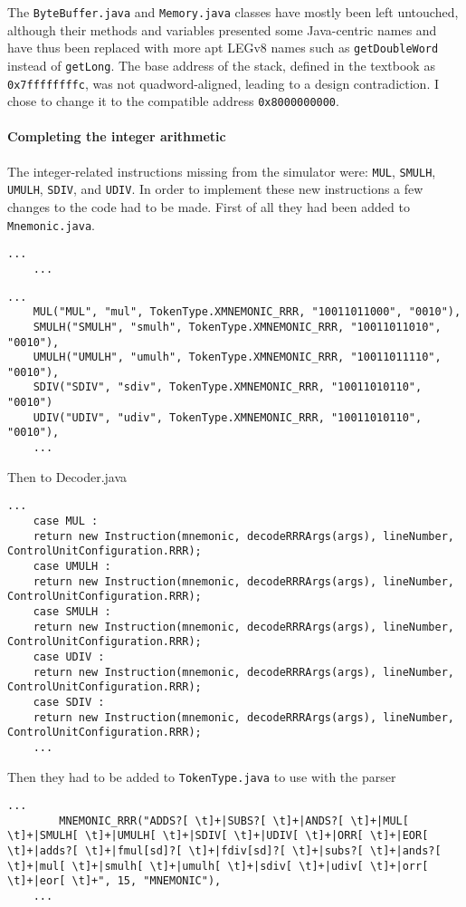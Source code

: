 The \verb|ByteBuffer.java| and \verb|Memory.java| classes have mostly been left untouched, although their methods and variables presented some Java-centric names and have thus been replaced with more apt LEGv8 names such as \verb|getDoubleWord| instead of \verb|getLong|. The base address of the stack, defined in the textbook as \verb|0x7ffffffffc|,  was not quadword-aligned, leading to a design contradiction. I chose to change it to the  compatible address \verb|0x8000000000|.

\paragraph{Completing the integer arithmetic}

The integer-related instructions missing from the simulator were: \verb|MUL|, \verb|SMULH|, \verb|UMULH|, \verb|SDIV|, and \verb|UDIV|. In order to implement these new instructions a few changes to the code had to be made. First of all they had been added to \verb|Mnemonic.java|.
\begin{lstlisting}[caption={}]
	...
	...
\end{lstlisting}
\begin{lstlisting}[caption={Added mnemonics}]
	...
	MUL("MUL", "mul", TokenType.XMNEMONIC_RRR, "10011011000", "0010"),
	SMULH("SMULH", "smulh", TokenType.XMNEMONIC_RRR, "10011011010", "0010"),
	UMULH("UMULH", "umulh", TokenType.XMNEMONIC_RRR, "10011011110", "0010"),
	SDIV("SDIV", "sdiv", TokenType.XMNEMONIC_RRR, "10011010110", "0010")
	UDIV("UDIV", "udiv", TokenType.XMNEMONIC_RRR, "10011010110", "0010"),
	...
\end{lstlisting}
Then to Decoder.java
\begin{lstlisting}[caption={Added instructions to the decoder}]
	...
	case MUL :
	return new Instruction(mnemonic, decodeRRRArgs(args), lineNumber, ControlUnitConfiguration.RRR);
	case UMULH :
	return new Instruction(mnemonic, decodeRRRArgs(args), lineNumber, ControlUnitConfiguration.RRR);
	case SMULH :
	return new Instruction(mnemonic, decodeRRRArgs(args), lineNumber, ControlUnitConfiguration.RRR);
	case UDIV :
	return new Instruction(mnemonic, decodeRRRArgs(args), lineNumber, ControlUnitConfiguration.RRR);
	case SDIV :
	return new Instruction(mnemonic, decodeRRRArgs(args), lineNumber, ControlUnitConfiguration.RRR);
	...
\end{lstlisting}
Then they had to be added to \verb|TokenType.java| to use with the parser
\begin{lstlisting}[caption={Addition to the parser}]
	...
		MNEMONIC_RRR("ADDS?[ \t]+|SUBS?[ \t]+|ANDS?[ \t]+|MUL[ \t]+|SMULH[ \t]+|UMULH[ \t]+|SDIV[ \t]+|UDIV[ \t]+|ORR[ \t]+|EOR[ \t]+|adds?[ \t]+|fmul[sd]?[ \t]+|fdiv[sd]?[ \t]+|subs?[ \t]+|ands?[ \t]+|mul[ \t]+|smulh[ \t]+|umulh[ \t]+|sdiv[ \t]+|udiv[ \t]+|orr[ \t]+|eor[ \t]+", 15, "MNEMONIC"),
	...
\end{lstlisting}
